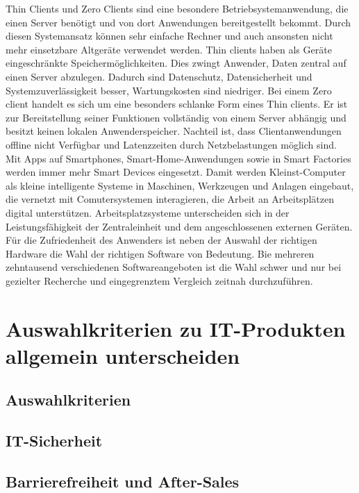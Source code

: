 \documentclass[a4paper, 12pt]{report}
\begin{document}
Thin Clients und Zero Clients sind eine besondere Betriebsystemanwendung, die 
einen Server benötigt und von dort Anwendungen bereitgestellt bekommt. Durch 
diesen Systemansatz können sehr einfache Rechner und auch ansonsten nicht mehr
einsetzbare Altgeräte verwendet werden. Thin clients haben als Geräte 
eingeschränkte Speichermöglichkeiten. Dies zwingt Anwender, Daten zentral auf 
einen Server abzulegen. Dadurch sind Datenschutz, Datensicherheit und 
Systemzuverlässigkeit besser, Wartungskosten sind niedriger. Bei einem Zero 
client handelt es sich um eine besonders schlanke Form eines Thin clients. 
Er ist zur Bereitstellung seiner Funktionen vollständig von einem Server 
abhängig und besitzt keinen lokalen Anwenderspeicher. Nachteil ist, dass 
Clientanwendungen offline nicht Verfügbar und Latenzzeiten durch Netzbelastungen 
möglich sind. \\

Mit Apps auf Smartphones, Smart-Home-Anwendungen sowie in Smart Factories werden
immer mehr Smart Devices eingesetzt. Damit werden Kleinst-Computer als kleine 
intelligente Systeme in Maschinen, Werkzeugen und Anlagen eingebaut, die 
vernetzt mit Comutersystemen interagieren, die Arbeit an Arbeitsplätzen digital
unterstützen. Arbeitsplatzsysteme unterscheiden sich in der Leistungsfähigkeit 
der Zentraleinheit und dem angeschlossenen externen Geräten. \\

Für die Zufriedenheit des Anwenders ist neben der Auswahl der richtigen Hardware
die Wahl der richtigen Software von Bedeutung. Bie mehreren zehntausend 
verschiedenen Softwareangeboten ist die Wahl schwer und nur bei gezielter 
Recherche und eingegrenztem Vergleich zeitnah durchzuführen. 

\section{Auswahlkriterien zu IT-Produkten allgemein unterscheiden}

\subsection{Auswahlkriterien}

\subsection{IT-Sicherheit}

\subsection{Barrierefreiheit und After-Sales}
\end{document}

